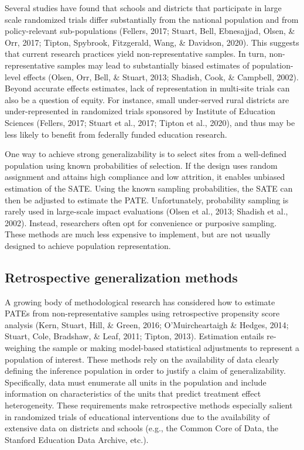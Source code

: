 \documentclass[
  english,
  man,floatsintext]{apa6}
\begin{document}
Several studies have found that schools and districts that participate in large scale randomized trials differ substantially from the national population and from policy-relevant sub-populations (Fellers, 2017; Stuart, Bell, Ebnesajjad, Olsen, \& Orr, 2017; Tipton, Spybrook, Fitzgerald, Wang, \& Davidson, 2020). This suggests that current research practices yield non-representative samples. In turn, non-representative samples may lead to substantially biased estimates of population-level effects (Olsen, Orr, Bell, \& Stuart, 2013; Shadish, Cook, \& Campbell, 2002). Beyond accurate effects estimates, lack of representation in multi-site trials can also be a question of equity. For instance, small under-served rural districts are under-represented in randomized trials sponsored by Institute of Education Sciences (Fellers, 2017; Stuart et al., 2017; Tipton et al., 2020), and thus may be less likely to benefit from federally funded education research.

One way to achieve strong generalizability is to select sites from a well-defined population using known probabilities of selection. If the design uses random assignment and attains high compliance and low attrition, it enables unbiased estimation of the SATE. Using the known sampling probabilities, the SATE can then be adjusted to estimate the PATE. Unfortunately, probability sampling is rarely used in large-scale impact evaluations (Olsen et al., 2013; Shadish et al., 2002). Instead, researchers often opt for convenience or purposive sampling. These methods are much less expensive to implement, but are not usually designed to achieve population representation.

\hypertarget{retrospective-generalization-methods}{%
\subsection{Retrospective generalization methods}\label{retrospective-generalization-methods}}

A growing body of methodological research has considered how to estimate PATEs from non-representative samples using retrospective propensity score analysis (Kern, Stuart, Hill, \& Green, 2016; O'Muircheartaigh \& Hedges, 2014; Stuart, Cole, Bradshaw, \& Leaf, 2011; Tipton, 2013). Estimation entails re-weighing the sample or making model-based statistical adjustments to represent a population of interest.
These methods rely on the availability of data clearly defining the inference population in order to justify a claim of generalizability. Specifically, data must enumerate all units in the population and include information on characteristics of the units that predict treatment effect heterogeneity. These requirements make retrospective methods especially salient in randomized trials of educational interventions due to the availability of extensive data on districts and schools (e.g., the Common Core of Data, the Stanford Education Data Archive, etc.).
\end{document}
